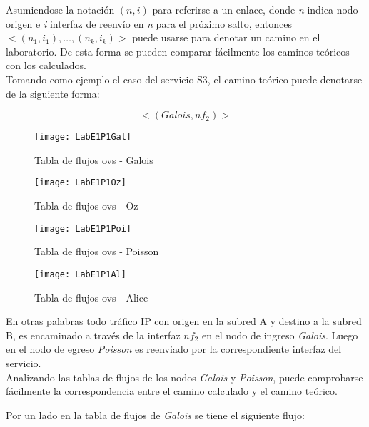 Asumiendose la notaci\'on $(n, i)$ para referirse a un enlace, donde \textit{n} indica nodo origen e \textit{i} interfaz de reenvío en \textit{n} para el próximo salto, entonces $<(n_1, i_1), \dots, (n_k, i_k)>$ puede usarse para denotar un camino en el laboratorio. De esta forma se pueden comparar f\'acilmente los caminos te\'oricos con los calculados.\\

Tomando como ejemplo el caso del servicio S3, el camino te\'orico puede denotarse de la siguiente forma:
 
$$<(Galois, nf_2)>$$

\begin{figure}[ht!] 
\centering    
\texttt{[image: LabE1P1Gal]}
\caption[Tabla de flujos ovs - Galois]{Tabla de flujos ovs - Galois}
\label{fig:CU1P1DumpFlows1}
\end{figure}

\begin{figure}[ht!] 
\centering    
\texttt{[image: LabE1P1Oz]}
\caption[Tabla de flujos ovs - Oz]{Tabla de flujos ovs - Oz}
\label{fig:CU1P1DumpFlows2}
\end{figure}

\begin{figure}[ht!] 
\centering    
\texttt{[image: LabE1P1Poi]}
\caption[Tabla de flujos ovs - Poisson]{Tabla de flujos ovs - Poisson}
\label{fig:CU1P1DumpFlows3}
\end{figure}

\begin{figure}[ht!] 
\centering    
\texttt{[image: LabE1P1Al]}
\caption[Tabla de flujos ovs - Alice]{Tabla de flujos ovs - Alice}
\label{fig:CU1P1DumpFlows4}
\end{figure}


En otras palabras todo tr\'afico IP con origen en la subred A y destino a la subred B, es encaminado a través de la interfaz $nf_2$ en el nodo de ingreso \textit{Galois}. Luego en el nodo de egreso \textit{Poisson} es reenviado por la correspondiente interfaz del servicio.\\

Analizando las tablas de flujos de los nodos \textit{Galois} y \textit{Poisson}, puede comprobarse fácilmente la correspondencia entre el camino calculado y el camino te\'orico.

Por un lado en la tabla de flujos de \textit{Galois} se tiene el siguiente flujo:


